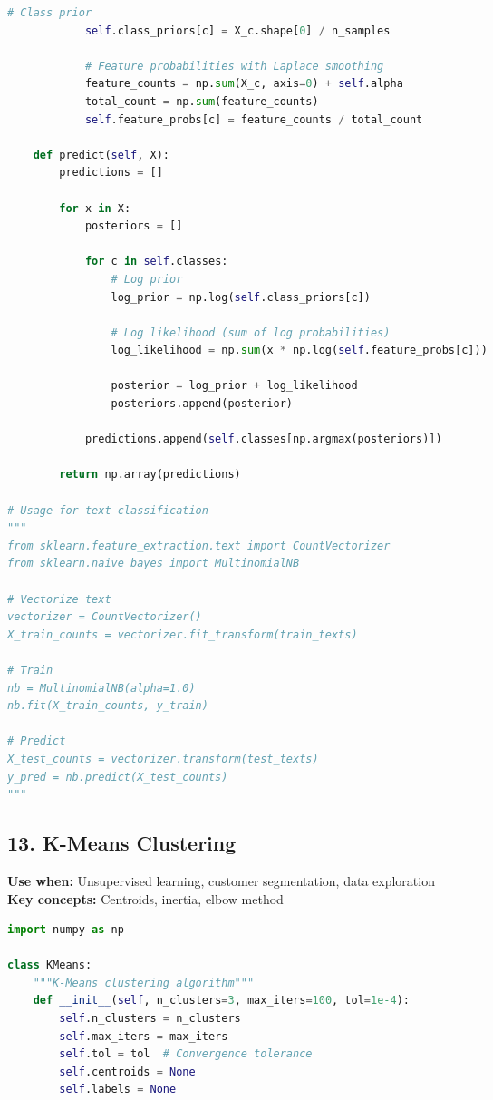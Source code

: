 \documentclass[8pt,landscape]{article}
\begin{document}
\begin{multicols}{3}
\begin{lstlisting}[language=Python]
            # Class prior
            self.class_priors[c] = X_c.shape[0] / n_samples

            # Feature probabilities with Laplace smoothing
            feature_counts = np.sum(X_c, axis=0) + self.alpha
            total_count = np.sum(feature_counts)
            self.feature_probs[c] = feature_counts / total_count

    def predict(self, X):
        predictions = []

        for x in X:
            posteriors = []

            for c in self.classes:
                # Log prior
                log_prior = np.log(self.class_priors[c])

                # Log likelihood (sum of log probabilities)
                log_likelihood = np.sum(x * np.log(self.feature_probs[c]))

                posterior = log_prior + log_likelihood
                posteriors.append(posterior)

            predictions.append(self.classes[np.argmax(posteriors)])

        return np.array(predictions)

# Usage for text classification
"""
from sklearn.feature_extraction.text import CountVectorizer
from sklearn.naive_bayes import MultinomialNB

# Vectorize text
vectorizer = CountVectorizer()
X_train_counts = vectorizer.fit_transform(train_texts)

# Train
nb = MultinomialNB(alpha=1.0)
nb.fit(X_train_counts, y_train)

# Predict
X_test_counts = vectorizer.transform(test_texts)
y_pred = nb.predict(X_test_counts)
"""
\end{lstlisting}

\subsection*{13. K-Means Clustering}
\textbf{Use when:} Unsupervised learning, customer segmentation, data exploration \\
\textbf{Key concepts:} Centroids, inertia, elbow method
\begin{lstlisting}[language=Python]
import numpy as np

class KMeans:
    """K-Means clustering algorithm"""
    def __init__(self, n_clusters=3, max_iters=100, tol=1e-4):
        self.n_clusters = n_clusters
        self.max_iters = max_iters
        self.tol = tol  # Convergence tolerance
        self.centroids = None
        self.labels = None


\end{lstlisting}
\end{multicols}
\end{document}
